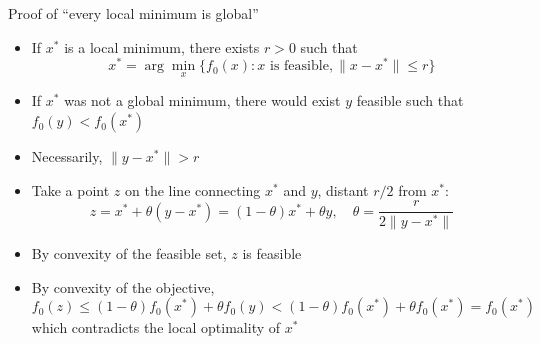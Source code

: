 \documentclass[aspectratio=169]{beamer}
\begin{document}
\begin{frame}{Proof of ``every local minimum is global''}
\begin{itemize}
\item
If $x^*$ is a local minimum, there exists $r > 0$ such that
$$
x^* = \arg \min_x \{ f_0(x) : x \text{\ is feasible}, \|x - x^*\| \leq r \}
$$
\item
If $x^*$ was not a global minimum, there would exist $y$ feasible such that $f_0(y) < f_0(x^*)$
\item
Necessarily, $\|y - x^*\| > r$
\item
Take a point $z$ on the line connecting $x^*$ and $y$, distant $r/2$ from $x^*$:
$$
z = x^* + \theta (y - x^*) = (1 - \theta) x^* + \theta y, \quad \theta = \frac{r}{2 \|y - x^*\|}
$$
\item
By convexity of the feasible set, $z$ is feasible
\item
By convexity of the objective,
$$
f_0(z) \leq (1 - \theta) f_0(x^*) + \theta f_0(y) < (1 - \theta) f_0(x^*) + \theta f_0(x^*) = f_0(x^*)
$$
which contradicts the local optimality of $x^*$
\end{itemize}
\end{frame}
\end{document}
